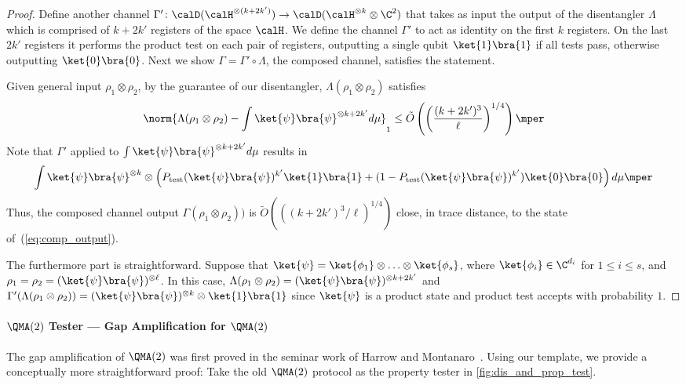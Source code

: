 \begin{proof}
  Define another channel $\Gamma' \colon \calD(\calH^{\otimes( k+2k')}) \to \calD(\calH^{\otimes k} \otimes \C^2)$ that takes as input
  the output of the disentangler $\Lambda$ which is comprised of $k+2k'$ registers of the space $\calH$. 
  We define the channel $\Gamma'$ to act as identity on the first $k$ registers. On the last $2k'$ registers it performs the product test
  on each pair of registers, outputting a single qubit $\ket{1}\bra{1}$ if all tests pass, otherwise outputting $\ket{0}\bra{0}$.
  Next we show $\Gamma = \Gamma' \circ \Lambda$, the composed channel, satisfies the statement.

  Given general input $\rho_1 \otimes \rho_2$, by the guarantee of our disentangler, $\Lambda(\rho_1 \otimes \rho_2)$ satisfies
  \begin{align*}
    \norm{\Lambda(\rho_1 \otimes \rho_2) - \int \ket{\psi}\bra{\psi}^{\otimes k+2k'} d\mu}_1 \le \tilde O\left(\left(\frac{(k+2k')^3}{\ell}\right)^{1/4}\right)\mper
  \end{align*}
  Note that $\Gamma'$ applied to $\int \ket{\psi}\bra{\psi}^{\otimes k+2k'} d\mu$ results in
  \begin{equation}\label{eq:comp_output}
    \int \ket{\psi}\bra{\psi}^{\otimes k} \otimes \left( P_{\text{test}}(\ket{\psi}\bra{\psi})^{k'}  \ket{1}\bra{1} +  (1-P_{\text{test}}(\ket{\psi}\bra{\psi})^{k'}) \ket{0}\bra{0} \right) d\mu \mper
  \end{equation}
  Thus, the composed channel output $\Gamma(\rho_1 \otimes \rho_2))$ is $\tilde O(((k+2k')^3/\ell)^{1/4})$ close, in trace distance, to the state of~(\ref{eq:comp_output}).

  
  The furthermore part is straightforward. Suppose that $\ket{\psi} = \ket{\phi_1}\otimes \ldots \otimes \ket{\phi_s}$, where $\ket{\phi_i} \in \C^{d_i}$ for $1 \le i \le s$,
  and $\rho_1 = \rho_2 = (\ket{\psi}\bra{\psi})^{\otimes \ell}$. In this case, $\Lambda(\rho_1 \otimes \rho_2) = (\ket{\psi}\bra{\psi})^{\otimes k+2k'}$
  and $\Gamma'(\Lambda(\rho_1 \otimes \rho_2)) = (\ket{\psi}\bra{\psi})^{\otimes k} \otimes \ket{1}\bra{1}$ since $\ket{\psi}$ is a product state
  and product test accepts with probability $1$.
\end{proof}

\paragraph{$\QMA(2)$ Tester --- Gap Amplification for $\QMA(2)$}
The gap amplification of $\QMA(2)$ was first proved in the seminar work of Harrow and Montanaro~\cite{HM13}. Using our template, we provide a conceptually more straightforward proof: Take the old $\QMA(2)$ protocol as the property tester in \cref{fig:dis_and_prop_test}.

